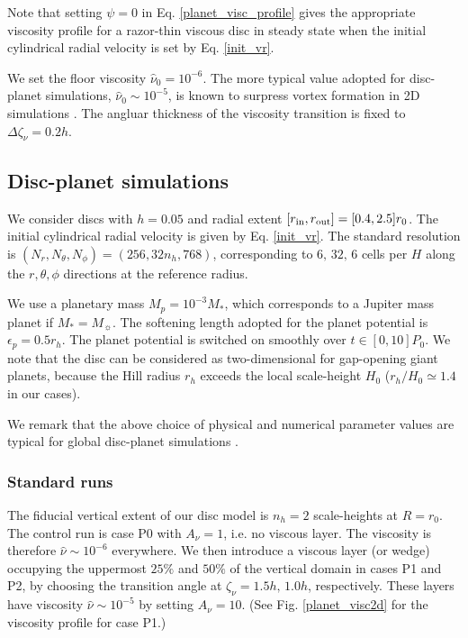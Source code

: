 Note that setting $\psi = 0$ in Eq. \ref{planet_visc_profile} gives
the appropriate viscosity profile for a razor-thin viscous disc in
steady state when the initial cylindrical radial velocity 
is set by Eq. \ref{init_vr}. 


We set the floor viscosity $\hat{\nu}_0=10^{-6}$. The more typical
value adopted for disc-planet simulations, $\hat{\nu}_0\sim 10^{-5}$,
is known to surpress vortex formation in 2D simulations
\citep{valborro07, mudryk09}. The angluar thickness of the viscosity
transition is fixed to $\Delta\zeta_\nu = 0.2h$.   

\subsection{Disc-planet simulations} 
We consider discs with $h=0.05$ and radial extent
$[r_\mathrm{in},r_\mathrm{out}]=[0.4,2.5]r_0$. The initial cylindrical radial velocity
is given by Eq. \ref{init_vr}. The standard resolution is $(N_r,
N_\theta, N_\phi)=(256, 32n_h, 768)$, corresponding to $6,\,32,\,6$
cells per $H$ along the $r,\theta,\phi$ directions 
at the reference radius. 

We use a planetary mass 
$M_p=10^{-3}M_*$, which corresponds to a Jupiter mass planet if
$M_*=M_{\sun}$. The softening length adopted for the planet potential is
$\epsilon_p=0.5r_h$. The planet potential is switched on 
smoothly over $t\in[0,10]P_0$. We note that the disc can be considered
as two-dimensional for gap-opening giant planets, because the Hill
radius $r_h$ exceeds the local scale-height $H_0$ ($r_h/H_0\simeq1.4$
in our cases).   

We remark that the above choice of physical and numerical parameter
values are typical for global disc-planet simulations
\citep[e.g.][]{valborro06,mignone12}.  


\subsubsection{Standard runs} 
The fiducial vertical extent of our disc model is $n_h=2$
scale-heights at $R=r_0$.  The control run is case P0 with $A_\nu=1$,
i.e. no viscous layer. The viscosity is therefore
$\hat{\nu}\sim10^{-6}$  everywhere. We then introduce a viscous
layer (or wedge) occupying the uppermost $25\%$ and $50\%$ of the
vertical domain in cases P1 and P2, by choosing the transition angle
at $\zeta_\nu = 1.5h,\,1.0h$, respectively. These layers have
viscosity $\hat{\nu}\sim 10^{-5}$ by setting $A_\nu=10$.  (See
Fig. \ref{planet_visc2d} for the viscosity profile for case P1.)  

